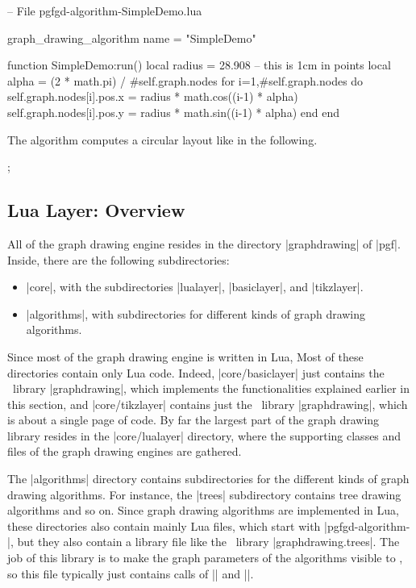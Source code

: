 \begin{codeexample}
-- File pgfgd-algorithm-SimpleDemo.lua

graph_drawing_algorithm { name = "SimpleDemo" }

function SimpleDemo:run()
  local radius = 28.908  -- this is 1cm in points
  local alpha = (2 * math.pi) / #self.graph.nodes
  for i=1,#self.graph.nodes do
    self.graph.nodes[i].pos.x = radius * math.cos((i-1) * alpha)
    self.graph.nodes[i].pos.y = radius * math.sin((i-1) * alpha)
  end
end
\end{codeexample}

The algorithm computes a circular layout like in the following.

\begin{codeexample}[]
\tikz [graph drawing scope, /graph drawing/algorithm=Simple Demo]
  ;
\end{codeexample}


\subsection{Lua Layer: Overview}

All of the graph drawing engine resides in the directory
|graphdrawing| of |pgf|. Inside, there are the following
subdirectories:

\begin{itemize}
\item |core|, with the subdirectories |lualayer|, |basiclayer|, and |tikzlayer|.
\item |algorithms|, with subdirectories for different kinds of graph
  drawing algorithms.
\end{itemize}

Since most of the graph drawing engine is written in Lua, Most of
these directories contain only Lua code. Indeed, |core/basiclayer|
just contains the \pgfname\ library |graphdrawing|, which implements
the functionalities explained earlier in this section, and
|core/tikzlayer| contains just the \tikzname\ library |graphdrawing|,
which is about a single page of code. By far the largest part of the
graph drawing library resides in the |core/lualayer| directory, where
the supporting classes and files of the graph drawing engines are
gathered.

The |algorithms| directory contains subdirectories for the different
kinds of graph drawing algorithms. For instance, the |trees|
subdirectory contains tree drawing algorithms and so on. Since graph
drawing algorithms are implemented in Lua, these directories also
contain mainly Lua files, which start with |pgfgd-algorithm-|, but
they also contain a library file like the \pgfname\ library
|graphdrawing.trees|. The job of this library is to make the graph
parameters of the algorithms visible to \pgfname, so this file
typically just contains calls of |\pgfgddeclarealgorithmkey| and
|\pgfgddeclareforwardedkeys|.

